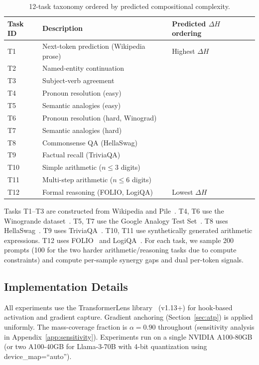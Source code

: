 \documentclass{article}
\newcommand{\DeltaH}{\Delta H}
\begin{document}
\begin{table}[h]
  \centering
  \caption{12-task taxonomy ordered by predicted compositional complexity.}
  \label{tab:tasks}
  \begin{tabular}{lll}
    \toprule
    Task ID & Description & Predicted $\DeltaH$ ordering \\
    \midrule
    T1 & Next-token prediction (Wikipedia prose) & Highest $\DeltaH$ \\
    T2 & Named-entity continuation             & \\
    T3 & Subject-verb agreement                & \\
    T4 & Pronoun resolution (easy)             & \\
    T5 & Semantic analogies (easy)             & \\
    T6 & Pronoun resolution (hard, Winograd)   & \\
    T7 & Semantic analogies (hard)             & \\
    T8 & Commonsense QA (HellaSwag)            & \\
    T9 & Factual recall (TriviaQA)             & \\
    T10 & Simple arithmetic ($n \leq 3$ digits) & \\
    T11 & Multi-step arithmetic ($n \leq 6$ digits) & \\
    T12 & Formal reasoning (FOLIO, LogiQA)     & Lowest $\DeltaH$ \\
    \bottomrule
  \end{tabular}
\end{table}

Tasks T1--T3 are constructed from Wikipedia and Pile~\citep{gao2020pile}.
T4, T6 use the Winogrande dataset~\citep{sakaguchi2021winogrande}.
T5, T7 use the Google Analogy Test Set~\citep{mikolov2013efficient}.
T8 uses HellaSwag~\citep{zellers2019hellaswag}.
T9 uses TriviaQA~\citep{joshi2017triviaqa}.
T10, T11 use synthetically generated arithmetic expressions.
T12 uses FOLIO~\citep{han2022folio} and LogiQA~\citep{liu2020logiqa}.
For each task, we sample 200 prompts (100 for the two harder arithmetic/reasoning
tasks due to compute constraints) and compute per-sample synergy gaps and dual
per-token signals.

\subsection{Implementation Details}
\label{sec:impl_details}

All experiments use the TransformerLens library~\citep{nanda2022transformerlens}
(v1.13+) for hook-based activation and gradient capture.
Gradient anchoring (Section~\ref{sec:atp}) is applied uniformly.
The mass-coverage fraction is $\alpha = 0.90$ throughout (sensitivity analysis in
Appendix~\ref{app:sensitivity}).
Experiments run on a single NVIDIA A100-80GB (or two A100-40GB for Llama-3-70B
with 4-bit quantization using device\_map=``auto'').
\end{document}
